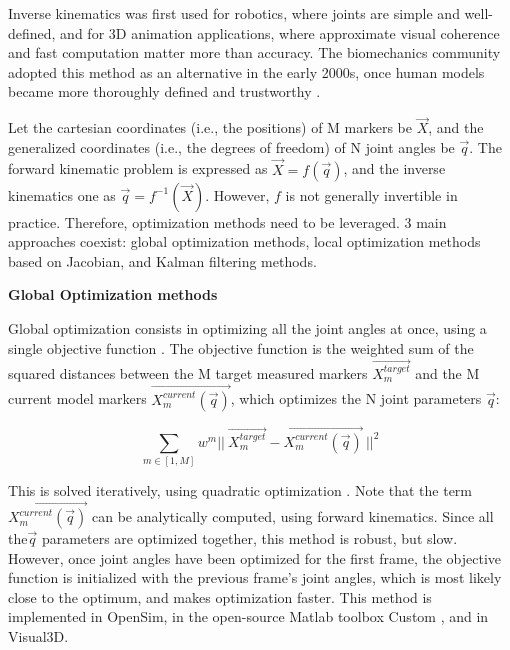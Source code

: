 Inverse kinematics was first used for robotics, where joints are simple and well-defined, and for 3D animation applications, where approximate visual coherence and fast computation matter more than accuracy. The biomechanics community adopted this method as an alternative in the early 2000s, once human models became more thoroughly defined and trustworthy \cite{Hicks2015}. 

Let the cartesian coordinates (i.e., the positions) of M markers be $\overrightarrow{X}$, and the generalized coordinates (i.e., the degrees of freedom) of N joint angles be $\overrightarrow{q}$. The forward kinematic problem is expressed as $\overrightarrow{X}=f(\overrightarrow{q})$, and the inverse kinematics one as $\overrightarrow{q}=f^{-1}(\overrightarrow{X})$. However, $f$ is not generally invertible in practice. Therefore, optimization methods need to be leveraged. 3 main approaches coexist: global optimization methods, local optimization methods based on Jacobian, and Kalman filtering methods.


\vspace*{0.5cm}
\noindent\textbf{Global Optimization methods}

Global optimization consists in optimizing all the joint angles at once, using a single objective function \cite{Lu1999}. The objective function is the weighted sum of the squared distances between the M target measured markers $\overrightarrow{X^{target}_m}$ and the M current model markers $\overrightarrow{X^{current}_m(\overrightarrow{q})}$, which optimizes the N joint parameters $\overrightarrow{q}$:

\begin{equation}
  \sum_{m \in [1,M]}
  w^m ||\ \overrightarrow{X^{target}_m} - \overrightarrow{X^{current}_m(\overrightarrow{q})} \ ||^2
\end{equation} 

This is solved iteratively, using quadratic optimization \cite{Boyd2004}. Note that the term $\overrightarrow{X^{current}_m(\overrightarrow{q})}$ can be analytically computed, using forward kinematics. Since all the$\overrightarrow{q}$ parameters are optimized together, this method is robust, but slow. However, once joint angles have been optimized for the first frame, the objective function is initialized with the previous frame's joint angles, which is most likely close to the optimum, and makes optimization faster. This method is implemented in OpenSim, in the open-source Matlab toolbox Custom \cite{Muller2019}, and in Visual3D.


